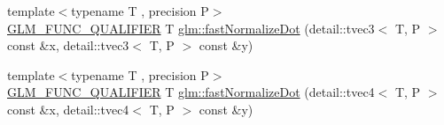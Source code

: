 \begin{DoxyCompactItemize}
\item 
{\footnotesize template$<$typename T , precision P$>$ }\\\hyperlink{setup_8hpp_a33fdea6f91c5f834105f7415e2a64407}{G\+L\+M\+\_\+\+F\+U\+N\+C\+\_\+\+Q\+U\+A\+L\+I\+F\+I\+ER} T \hyperlink{namespaceglm_a6a98cf963739276c2f766c34bb531bf5}{glm\+::fast\+Normalize\+Dot} (detail\+::tvec3$<$ T, P $>$ const \&x, detail\+::tvec3$<$ T, P $>$ const \&y)
\item 
{\footnotesize template$<$typename T , precision P$>$ }\\\hyperlink{setup_8hpp_a33fdea6f91c5f834105f7415e2a64407}{G\+L\+M\+\_\+\+F\+U\+N\+C\+\_\+\+Q\+U\+A\+L\+I\+F\+I\+ER} T \hyperlink{namespaceglm_a3dec6f079e401edfcf637fa8b89e7c92}{glm\+::fast\+Normalize\+Dot} (detail\+::tvec4$<$ T, P $>$ const \&x, detail\+::tvec4$<$ T, P $>$ const \&y)
\end{DoxyCompactItemize}
